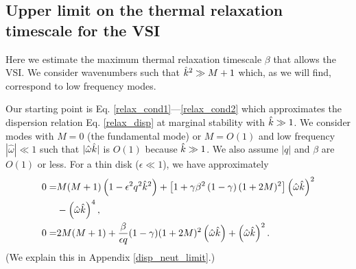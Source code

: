 
\subsection{Upper limit on the thermal relaxation timescale for the
  VSI}\label{iso_vsi_beta_crit}
Here we estimate the maximum thermal relaxation timescale
$\beta$ that allows the VSI. We consider wavenumbers such that
$\hat{k}^2\gg M+1$ which, as we will find, correspond to low frequency
modes. 


Our starting point is Eq. \ref{relax_cond1}---\ref{relax_cond2} which
approximates the dispersion relation Eq. \ref{relax_disp} at marginal
stability with $\hat{k}\gg 1$. We consider modes with $M=0$ (the
fundamental mode) or  $M=O(1)$ and low frequency $|\hat{\omega}|\ll
1$ such that $|\hat{\omega}\hat{k}|$ is $O(1)$ because $\hat{k}\gg 1$. We
also assume $|q|$ and $\beta$ are $O(1)$ or less. For a thin disk
($\epsilon \ll 1$), we have approximately
\begin{align}
 0 = &M(M+1)\left(1-\epsilon^2q^2\hat{k}^2\right) + \left[1 +
    \gamma\beta^2\left(1-\gamma\right)(1+2M)^2\right]\left(\hat{\omega}\hat{k}\right)^2\notag\\
   &-  \left(\hat{\omega}\hat{k}\right)^4,\label{relax_cond_simp1}\\
   0= &2M(M+1) + \frac{\beta}{\epsilon q} (1-\gamma)(1+2M)^2
   \left(\hat{\omega}\hat{k}\right) + \left(\hat{\omega}\hat{k}\right)^2. \label{relax_cond_simp2}
\end{align}
(We explain this in Appendix \ref{disp_neut_limit}.)

